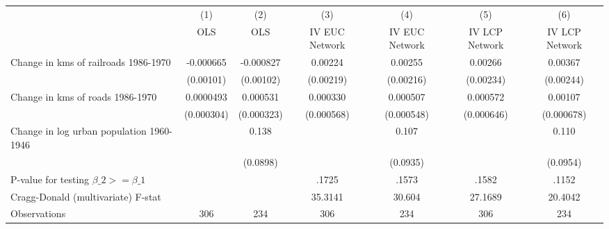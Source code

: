 {
\def\sym#1{\ifmmode^{#1}\else\(^{#1}\)\fi}
\begin{tabular}{l*{6}{c}}
\hline\hline
                &\multicolumn{1}{c}{(1)}&\multicolumn{1}{c}{(2)}&\multicolumn{1}{c}{(3)}&\multicolumn{1}{c}{(4)}&\multicolumn{1}{c}{(5)}&\multicolumn{1}{c}{(6)}\\
                &\multicolumn{1}{c}{OLS}&\multicolumn{1}{c}{OLS}&\multicolumn{1}{c}{IV EUC Network}&\multicolumn{1}{c}{IV EUC Network}&\multicolumn{1}{c}{IV LCP Network}&\multicolumn{1}{c}{IV LCP Network}\\
\hline
Change in kms of railroads 1986-1970&-0.000665         &-0.000827         &  0.00224         &  0.00255         &  0.00266         &  0.00367         \\
                &(0.00101)         &(0.00102)         &(0.00219)         &(0.00216)         &(0.00234)         &(0.00244)         \\
[1em]
Change in kms of roads 1986-1970&0.0000493         & 0.000531         & 0.000330         & 0.000507         & 0.000572         &  0.00107         \\
                &(0.000304)         &(0.000323)         &(0.000568)         &(0.000548)         &(0.000646)         &(0.000678)         \\
[1em]
Change in log urban population 1960-1946&                  &    0.138         &                  &    0.107         &                  &    0.110         \\
                &                  & (0.0898)         &                  & (0.0935)         &                  & (0.0954)         \\
\hline
P-value for testing $\beta\_{2} >= \beta\_{1}$&                  &                  &    .1725         &    .1573         &    .1582         &    .1152         \\
Cragg-Donald (multivariate) F-stat&                  &                  &  35.3141         &   30.604         &  27.1689         &  20.4042         \\
Observations    &      306         &      234         &      306         &      234         &      306         &      234         \\
\hline\hline
\end{tabular}
}
